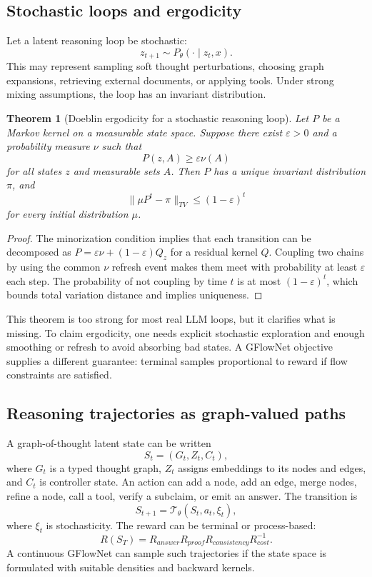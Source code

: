 \documentclass[11pt]{article}
\newtheorem{theorem}[definition]{Theorem}
\newcommand{\1}{\mathbf{1}}
\newcommand{\eps}{\varepsilon}
\begin{document}
\subsection{Stochastic loops and ergodicity}

Let a latent reasoning loop be stochastic:
\[
z_{t+1}\sim P_\theta(\cdot\mid z_t,x).
\]
This may represent sampling soft thought perturbations, choosing graph expansions, retrieving external documents, or applying tools. Under strong mixing assumptions, the loop has an invariant distribution.

\begin{theorem}[Doeblin ergodicity for a stochastic reasoning loop]
Let $P$ be a Markov kernel on a measurable state space. Suppose there exist $\eps>0$ and a probability measure $\nu$ such that
\[
P(z,A)\ge \eps\nu(A)
\]
for all states $z$ and measurable sets $A$. Then $P$ has a unique invariant distribution $\pi$, and
\[
\|\mu P^t-\pi\|_{TV}\le (1-\eps)^t
\]
for every initial distribution $\mu$.
\end{theorem}
\begin{proof}
The minorization condition implies that each transition can be decomposed as $P=\eps \nu +(1-\eps)Q_z$ for a residual kernel $Q$. Coupling two chains by using the common $\nu$ refresh event makes them meet with probability at least $\eps$ each step. The probability of not coupling by time $t$ is at most $(1-\eps)^t$, which bounds total variation distance and implies uniqueness.
\end{proof}

This theorem is too strong for most real LLM loops, but it clarifies what is missing. To claim ergodicity, one needs explicit stochastic exploration and enough smoothing or refresh to avoid absorbing bad states. A GFlowNet objective supplies a different guarantee: terminal samples proportional to reward if flow constraints are satisfied.

\subsection{Reasoning trajectories as graph-valued paths}

A graph-of-thought latent state can be written
\[
S_t=(G_t,Z_t,C_t),
\]
where $G_t$ is a typed thought graph, $Z_t$ assigns embeddings to its nodes and edges, and $C_t$ is controller state. An action can add a node, add an edge, merge nodes, refine a node, call a tool, verify a subclaim, or emit an answer. The transition is
\[
S_{t+1}=\mathcal{T}_\theta(S_t,a_t,\xi_t),
\]
where $\xi_t$ is stochasticity. The reward can be terminal or process-based:
\[
R(S_T)=R_{answer}R_{proof}R_{consistency}R_{cost}^{-1}.
\]
A continuous GFlowNet can sample such trajectories if the state space is formulated with suitable densities and backward kernels.
\end{document}
